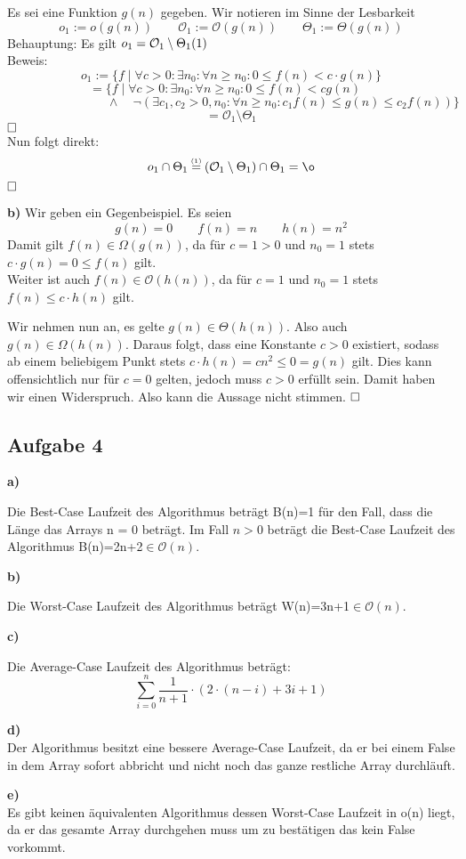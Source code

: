 \documentclass[a4paper,graphics,11pt]{article}
\newcommand{\aufgabe}[1]{\subsection*{Aufgabe #1}}
\newcommand{\up}[2]{\mathrel{\overset{\makebox[0pt]{\mbox{\normalfont\tiny #2}}}{#1}}}
\begin{document}
Es sei eine Funktion $g(n)$ gegeben.
Wir notieren im Sinne der Lesbarkeit
$$
	o_1 := o(g(n)) \qquad \mathcal{O}_1 := \mathcal{O}(g(n)) \qquad \Theta_1 := \Theta(g(n))
$$
Behauptung: Es gilt $o_1 = \mathcal{O}_1 \setminus \Theta_1\hfill(1)$\\
Beweis:
$$
	o_1 := \{f \mid \forall c > 0 : \exists n_0 : \forall n\geq n_0 : 0 \leq f(n) < c\cdot g(n)\}
$$$$
	= \{f \mid \forall c > 0 : \exists n_0 : \forall n\geq n_0 : 0 \leq f(n) < cg(n)\quad
$$$$
	\qquad\qquad\qquad\qquad\land \quad \lnot(\exists c_1,c_2 > 0,n_0 : \forall n\geq n_0 : c_1f(n) \leq g(n) \leq c_2f(n))\}
$$$$
	= \mathcal{O}_1 \setminus \Theta_1
$$
$\hfill\square$\\
Nun folgt direkt:
$$
	o_1 \cap \Theta_1
	\up{=}{(1)} (\mathcal{O}_1 \setminus \Theta_1) \cap \Theta_1 = \o
$$
$\hfill\square$

\textbf{b)}
Wir geben ein Gegenbeispiel.
Es seien
$$
	g(n) = 0 \qquad f(n) = n \qquad h(n) = n^2
$$
Damit gilt $f(n) \in \Omega(g(n))$, da für $c = 1 > 0$ und $n_0 = 1$ stets $c\cdot g(n) = 0 \leq f(n)$ gilt.\\
Weiter ist auch $f(n) \in \mathcal{O}(h(n))$, da für $c = 1$ und $n_0 = 1$ stets $f(n) \leq c\cdot h(n)$ gilt.

Wir nehmen nun an, es gelte $g(n) \in \Theta(h(n))$. Also auch $g(n) \in \Omega(h(n))$. Daraus folgt, dass eine Konstante
$c > 0$ existiert, sodass ab einem beliebigem Punkt stets $c \cdot h(n) = cn^2 \leq 0 = g(n)$ gilt. Dies kann offensichtlich
nur für $c = 0$ gelten, jedoch muss $c > 0$ erfüllt sein. Damit haben wir einen Widerspruch. Also kann die Aussage nicht stimmen.
$\hfill\square$

\newpage
\aufgabe{4}
\textbf{a)}

Die Best-Case Laufzeit des Algorithmus beträgt B(n)=1 für den Fall, dass die Länge das Arrays n = 0 beträgt. Im Fall $n > 0$ beträgt die Best-Case Laufzeit des Algorithmus B(n)=2n+2$\in \mathcal{O}(n)$.

\textbf{b)}

Die Worst-Case Laufzeit des Algorithmus beträgt W(n)=3n+1$\in \mathcal{O}(n)$.

\textbf{c)}

Die Average-Case Laufzeit des Algorithmus beträgt:
$$
\sum_{i=0}^{n} \frac{1}{n+1} \cdot (2 \cdot (n-i)+3i+1)
$$

\textbf{d)}\\



Der Algorithmus besitzt eine bessere Average-Case Laufzeit, da er bei einem False in dem Array sofort abbricht und nicht noch das ganze restliche Array durchläuft.

\textbf{e)}\\

Es gibt keinen äquivalenten Algorithmus dessen Worst-Case Laufzeit in o(n) liegt, da er das gesamte Array durchgehen muss um zu bestätigen das kein False vorkommt. 
\end{document}
